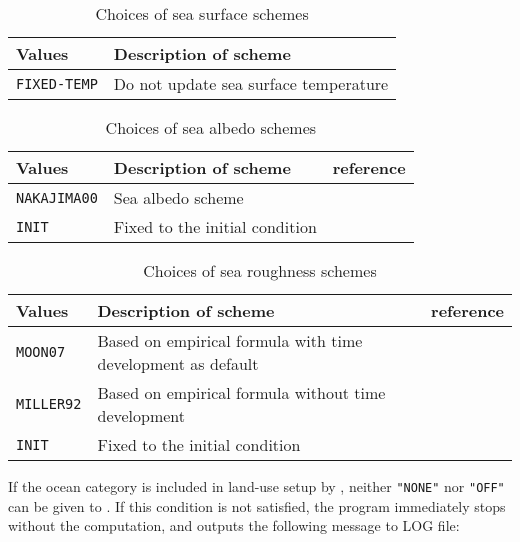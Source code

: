 \begin{table}[h]
\begin{center}
  \caption{Choices of sea surface schemes}
  \label{tab:nml_ocean_sfc}
  \begin{tabularx}{150mm}{lX} \hline
    \rowcolor[gray]{0.9}  Values & Description of scheme \\ \hline
      \verb|FIXED-TEMP| & Do not update sea surface temperature \\
    \hline
  \end{tabularx}
\end{center}
\end{table}

\begin{table}[h]
\begin{center}
  \caption{Choices of sea albedo schemes}
  \label{tab:nml_ocean_alb}
  \begin{tabularx}{150mm}{llX} \hline
    \rowcolor[gray]{0.9}  Values & Description of scheme & reference \\ \hline
      \verb|NAKAJIMA00| & Sea albedo scheme & \citet{nakajima_2000} \\
      \verb|INIT|       & Fixed to the initial condition \\
    \hline
  \end{tabularx}
\end{center}
\end{table}

\begin{table}[h]
\begin{center}
  \caption{Choices of sea roughness schemes}
  \label{tab:nml_ocean_rgn}
  \begin{tabularx}{150mm}{llX} \hline
    \rowcolor[gray]{0.9}  Values & Description of scheme & reference \\ \hline
      \verb|MOON07|   & Based on empirical formula with time development as default & \citet{moon_2007} \\
      \verb|MILLER92| & Based on empirical formula without time development          & \citet{miller_1992} \\
      \verb|INIT|     & Fixed to the initial condition \\
    \hline
  \end{tabularx}
\end{center}
\end{table}

If the ocean category is included in land-use setup by , neither \verb|"NONE"| nor \verb|"OFF"| can be given to . If this condition is not satisfied, the program immediately stops without the computation, and outputs the following message to LOG file:

